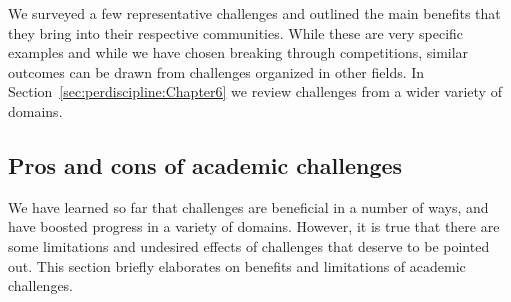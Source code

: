 \documentclass[twoside,11pt]{article}
\begin{document}
\begin{itemize}
\end{itemize}

We surveyed a few representative challenges and outlined the main benefits that they bring into their respective communities. While these are very specific examples and while we have chosen breaking through competitions, similar outcomes can be drawn from challenges organized in other fields. In Section~\ref{sec:perdiscipline:Chapter6} we review challenges from a wider variety of domains. %

\subsection{Pros and cons of academic challenges}
We have learned so far that challenges are beneficial in a number of ways, and have boosted progress in a variety of domains. However, it is true that there are some limitations and undesired effects of challenges that deserve to be pointed out. This section briefly elaborates on benefits and limitations of academic challenges. 
\end{document}
